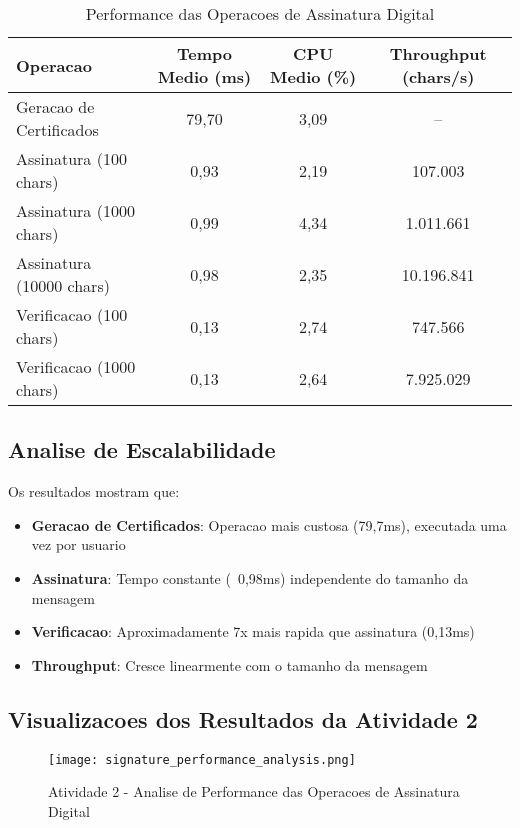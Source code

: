 \documentclass[12pt,a4paper,oneside]{article}
\begin{document}
\begin{table}[H]
\centering
\caption{Performance das Operacoes de Assinatura Digital}
\label{tab:signature_performance}
\begin{tabular}{lccc}
\toprule
\textbf{Operacao} & \textbf{Tempo Medio (ms)} & \textbf{CPU Medio (\%)} & \textbf{Throughput (chars/s)} \\
\midrule
Geracao de Certificados & 79,70 & 3,09 & -- \\
Assinatura (100 chars) & 0,93 & 2,19 & 107.003 \\
Assinatura (1000 chars) & 0,99 & 4,34 & 1.011.661 \\
Assinatura (10000 chars) & 0,98 & 2,35 & 10.196.841 \\
Verificacao (100 chars) & 0,13 & 2,74 & 747.566 \\
Verificacao (1000 chars) & 0,13 & 2,64 & 7.925.029 \\
\bottomrule
\end{tabular}
\end{table}

\subsection{Analise de Escalabilidade}

Os resultados mostram que:

\begin{itemize}
    \item \textbf{Geracao de Certificados}: Operacao mais custosa (79,7ms), executada uma vez por usuario
    \item \textbf{Assinatura}: Tempo constante (~0,98ms) independente do tamanho da mensagem
    \item \textbf{Verificacao}: Aproximadamente 7x mais rapida que assinatura (0,13ms)
    \item \textbf{Throughput}: Cresce linearmente com o tamanho da mensagem
\end{itemize}

\subsection{Visualizacoes dos Resultados da Atividade 2}

\begin{figure}[H]
\centering
\texttt{[image: signature\_performance\_analysis.png]}
\caption{Atividade 2 - Analise de Performance das Operacoes de Assinatura Digital}
\label{fig:signature_performance}
\end{figure}
\end{document}
